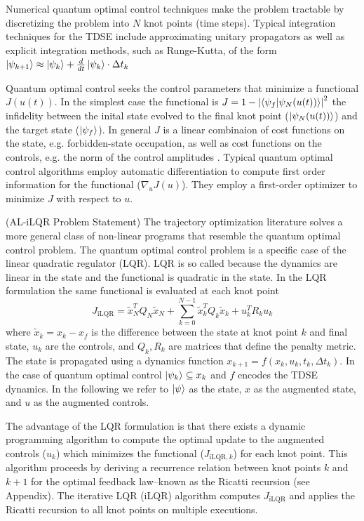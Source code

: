 \documentclass[
  amsfonts,
  amsmath,
  tbtags,
  amssymb,
  aps,
  nobibnotes,
  twocolumn,
  superscriptaddress,
]{revtex4-2}
\begin{document}
Numerical quantum optimal control techniques make
the problem tractable by discretizing the problem into $N$
knot points (time steps). Typical integration techniques for the TDSE include
approximating unitary propagators as well as explicit integration methods,
such as Runge-Kutta, of the form
$\ket{\psi_{k + 1}} \approx \ket{\psi_{k}} + \frac{d}{dt} \ket{\psi_{k}} \cdot \Delta t_{k}$

Quantum optimal control seeks the control
parameters that minimize a functional $J(u(t))$.
In the simplest case the functional is
$J = 1 - {\lvert \braket{\psi_{f} \lvert \psi_{N}(u(t))} \rvert}^{2}$
the infidelity between the inital state evolved
to the final knot point ($\ket{\psi_{N}(u(t))}$)
and the target state ($\ket{\psi_{f}}$). In general
$J$ is a linear combinaion of cost functions on the state, e.g.
forbidden-state occupation, as well as
cost functions on the controls, e.g. the norm of the control amplitudes
\cite{leung2017speedup}. Typical quantum optimal control
algorithms employ automatic differentiation
to compute first order information for the functional ($\nabla_{u} J(u)$).
They employ a first-order optimizer to minimize $J$ with respect to $u$.

(AL-iLQR Problem Statement) The trajectory optimization
literature solves a more general class of non-linear programs that resemble
the quantum optimal control problem. The quantum optimal control
problem is a specific case of the linear quadratic regulator (LQR).
LQR is so called because the dynamics are linear in the state and
the functional is quadratic in the state. In the LQR formulation
the same functional is evaluated at each knot point
\begin{equation}
  J_{\textrm{iLQR}} = \tilde{x}_{N}^{T} Q_{N} \tilde{x}_{N}
  + \sum_{k = 0}^{N - 1} \tilde{x}_{k}^{T} Q_{k} \tilde{x}_{k} + u_{k}^{T} R_{k} u_{k}
\end{equation}
where $\tilde{x}_{k} = x_{k} - x_{f}$ is the difference between the state
at knot point $k$ and final state, $u_{k}$ are the controls,
and $Q_{k}, R_{k}$ are matrices that define the penalty metric.
The state is propagated using a dynamics function
$x_{k + 1} = f(x_{k}, u_{k}, t_{k}, \Delta t_{k})$.
In the case of quantum optimal control $\ket{\psi_{k}} \subseteq x_{k}$
and $f$ encodes the TDSE dynamics. In the following
we refer to $\ket{\psi}$ as the state, $x$ as the augmented
state, and $u$ as the augmented controls.

The advantage of the LQR formulation
is that there exists a dynamic programming algorithm to compute the
optimal update to the augmented controls ($u_{k}$) which minimizes the functional
($J_{\textrm{iLQR}, k}$) for each knot point. This algorithm proceeds by deriving a
recurrence relation between knot points $k$ and $k + 1$ for the optimal
feedback law--known as the Ricatti recursion (see Appendix). The
iterative LQR (iLQR) algorithm computes $J_{\textrm{iLQR}}$
and applies the Ricatti recursion to all knot points on multiple
executions.
\end{document}

